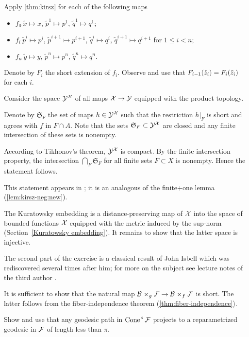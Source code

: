Apply \ref{thm:kirsz} for each of the following maps
\begin{itemize}
\item $f_0\:\tilde x\mapsto x$, $\tilde p^1\mapsto p^1$, $\tilde q^1\mapsto q^1$;
\item $f_i\:\tilde p^i\mapsto p^i$, $\tilde p^{i+1}\mapsto p^{i+1}$, $\tilde q^i\mapsto q^i$, $\tilde q^{i+1}\mapsto q^{i+1}$ for $1\le i<n$;
\item $f_n\:\tilde y\mapsto y$, $\tilde p^n\mapsto p^n$, $\tilde q^n\mapsto q^n$.
\end{itemize}
Denote by $F_i$ the short extension of $f_i$.
Observe and use that $F_{i-1}(\tilde z_i)\z=F_{i}(\tilde z_i)$ for each $i$.

 Consider the space $\mathcal{Y}^{\mathcal{X}}$ of all maps $\spc{X}\to \spc{Y}$ equipped with the product topology.

Denote by $\mathfrak{S}_F$ the set of maps $h\in \spc{Y}^\spc{X}$ such that the restriction $h|_F$  is short and agrees with $f$ in $F\cap A$.
Note that the sets $\mathfrak{S}_F\subset \spc{Y}^\spc{X}$ are closed and any finite intersection of these sets is nonempty.

According to Tikhonov's theorem, $\mathcal{Y}^{\mathcal{X}}$ is compact.
By the finite intersection property, the intersection $\bigcap_F\mathfrak{S}_F$ for all finite sets $F\subset X$ is nonempty.
Hence the statement follows.

 This statement appears in \cite{petrunin-stadler}; it is an analogous of the finite+one lemma (\ref{lem:kirsz-neg:new}).

The Kuratowsky embedding is a distance-preserving map of $\mathcal{X}$ into the space of bounded functions $\mathcal{X}$ equipped with the metric induced by the sup-norm (Section~\ref{Kuratowsky embedding}).
It remains to show that the latter space is injective.

The second part of the exercise is a classical result of John Isbell \cite{isbell} which was rediscovered several times after him; for more on the subject see lecture notes of the third author \cite{petrunin2020pure}.

It is sufficient to show that the natural map $\spc{B}\warp{g}\spc{F}\to \spc{B}\warp{f}\spc{F}$ is short.
The latter follows from the fiber-independence theorem (\ref{thm:fiber-independence}).

Show and use that any geodesic path in $\mathop{\rm Cone}\nolimits^\upkappa\mathcal{F}$ projects to a reparametrized geodesic in $\mathcal{F}$ of length less than $\pi$.

